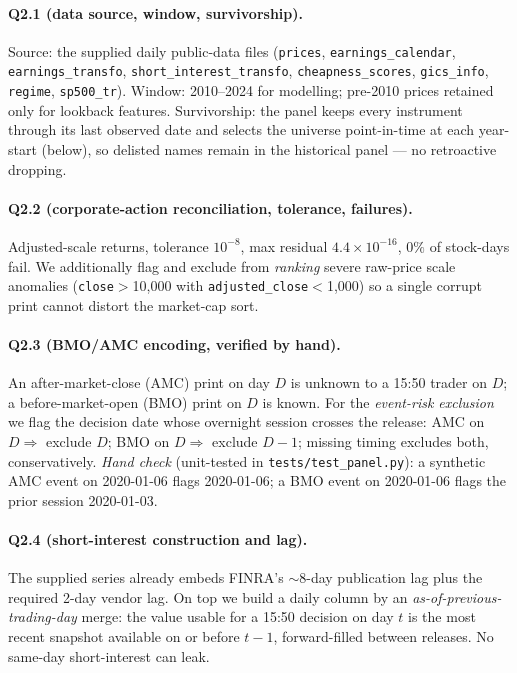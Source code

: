 \documentclass[11pt,a4paper]{article}
\newcommand{\code}[1]{\texttt{#1}}
\newcommand{\reconResid}{4.4\times10^{-16}}
\begin{document}
\paragraph{Q2.1 (data source, window, survivorship).} Source: the supplied daily public-data files
(\code{prices}, \code{earnings\_calendar}, \code{earnings\_transfo}, \code{short\_interest\_transfo},
\code{cheapness\_scores}, \code{gics\_info}, \code{regime}, \code{sp500\_tr}). Window: 2010--2024 for modelling;
pre-2010 prices retained only for lookback features. Survivorship: the panel keeps every instrument through its
last observed date and selects the universe point-in-time at each year-start (below), so delisted names remain
in the historical panel --- no retroactive dropping.

\paragraph{Q2.2 (corporate-action reconciliation, tolerance, failures).} Adjusted-scale returns, tolerance
$10^{-8}$, max residual $\reconResid$, $0\%$ of stock-days fail. We additionally flag and exclude from
\emph{ranking} severe raw-price scale anomalies (\code{close}$>$10{,}000 with \code{adjusted\_close}$<$1{,}000)
so a single corrupt print cannot distort the market-cap sort.

\paragraph{Q2.3 (BMO/AMC encoding, verified by hand).} An after-market-close (AMC) print on day $D$ is unknown
to a 15:50 trader on $D$; a before-market-open (BMO) print on $D$ is known. For the \emph{event-risk exclusion}
we flag the decision date whose overnight session crosses the release: AMC on $D\Rightarrow$ exclude $D$; BMO on
$D\Rightarrow$ exclude $D{-}1$; missing timing excludes both, conservatively. \emph{Hand check} (unit-tested in
\code{tests/test\_panel.py}): a synthetic AMC event on 2020-01-06 flags 2020-01-06; a BMO event on 2020-01-06
flags the prior session 2020-01-03.

\paragraph{Q2.4 (short-interest construction and lag).} The supplied series already embeds FINRA's
$\sim$8-day publication lag plus the required 2-day vendor lag. On top we build a daily column by an
\emph{as-of-previous-trading-day} merge: the value usable for a 15:50 decision on day $t$ is the most recent
snapshot available on or before $t{-}1$, forward-filled between releases. No same-day short-interest can leak.
\end{document}
